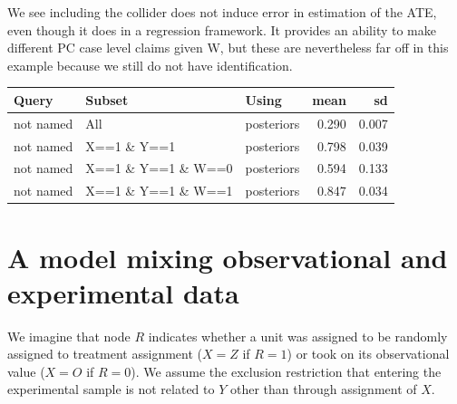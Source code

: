 \documentclass[12pt,]{book}
\newenvironment{Shaded}{\begin{snugshade}}{\end{snugshade}}
\newcommand{\DataTypeTok}[1]{\textcolor[rgb]{0.13,0.29,0.53}{#1}}
\newcommand{\KeywordTok}[1]{\textcolor[rgb]{0.13,0.29,0.53}{\textbf{#1}}}
\newcommand{\NormalTok}[1]{#1}
\newcommand{\OperatorTok}[1]{\textcolor[rgb]{0.81,0.36,0.00}{\textbf{#1}}}
\newcommand{\StringTok}[1]{\textcolor[rgb]{0.31,0.60,0.02}{#1}}
\begin{document}
We see including the collider does not induce error in estimation of the ATE, even though it does in a regression framework. It provides an ability to make different PC case level claims given W, but these are nevertheless far off in this example because we still do not have identification.

\begin{tabular}{l|l|l|r|r}
\hline
Query & Subset & Using & mean & sd\\
\hline
not named & All & posteriors & 0.290 & 0.007\\
\hline
not named & X==1 \& Y==1 & posteriors & 0.798 & 0.039\\
\hline
not named & X==1 \& Y==1 \& W==0 & posteriors & 0.594 & 0.133\\
\hline
not named & X==1 \& Y==1 \& W==1 & posteriors & 0.847 & 0.034\\
\hline
\end{tabular}

\hypertarget{a-model-mixing-observational-and-experimental-data}{%
\section{A model mixing observational and experimental data}\label{a-model-mixing-observational-and-experimental-data}}

We imagine that node \(R\) indicates whether a unit was assigned to be randomly assigned to treatment assignment (\(X=Z\) if \(R=1\)) or took on its observational value (\(X=O\) if \(R=0\)). We assume the exclusion restriction that entering the experimental sample is not related to \(Y\) other than through assignment of \(X\).

\begin{Shaded}
\end{Shaded}
\end{document}
